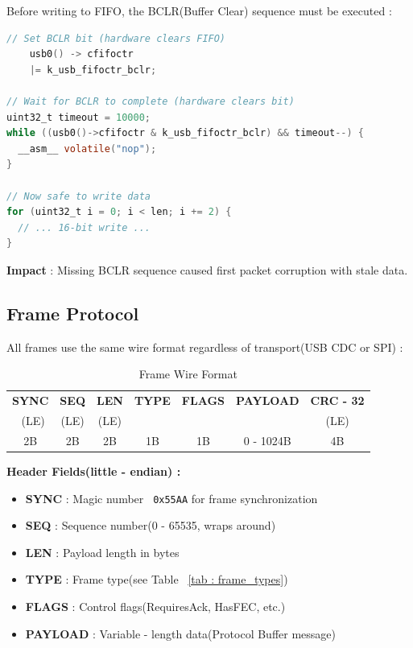                   Before writing to FIFO,
    the BCLR(Buffer Clear) sequence must be executed :

\begin{lstlisting}[language = C, caption = {FIFO Clear Before Write},
                    label = {lst : fifo_clear}]
    // Set BCLR bit (hardware clears FIFO)
    usb0() -> cfifoctr
    |= k_usb_fifoctr_bclr;

// Wait for BCLR to complete (hardware clears bit)
uint32_t timeout = 10000;
while ((usb0()->cfifoctr & k_usb_fifoctr_bclr) && timeout--) {
  __asm__ volatile("nop");
}

// Now safe to write data
for (uint32_t i = 0; i < len; i += 2) {
  // ... 16-bit write ...
}
\end{lstlisting}

\textbf{Impact}
    : Missing BCLR sequence caused first packet corruption with stale data.

\subsection{Frame Protocol}

      All frames use the same wire format regardless of
      transport(USB CDC or SPI)
    :

\begin{table}[h]
\centering
\begin{tabular} {
  ccccccc
}
\toprule
\textbf{SYNC} & \textbf{SEQ} & \textbf{LEN} & \textbf{TYPE} & \textbf{FLAGS} & \textbf{PAYLOAD} & \textbf{CRC - 32} \\
\ (LE) & (LE) & (LE) & &&&(LE) \\
\midrule 2B & 2B & 2B & 1B & 1B & 0 - 1024B & 4B \\
\bottomrule
\end{tabular}
\caption { Frame Wire Format}
\label {
tab:
  frame_format
}
\end{table}

\textbf{Header Fields(little - endian) :}
\begin{itemize}
\item \textbf{SYNC} : Magic number \texttt { 0x55AA} for
  frame synchronization
\item \textbf{SEQ} : Sequence number(0 - 65535, wraps around)
\item \textbf{LEN} : Payload length in bytes
\item \textbf{TYPE} : Frame
                       type(see Table ~\ref{tab : frame_types})
\item \textbf{FLAGS} : Control flags(RequiresAck, HasFEC, etc.)
\item \textbf{PAYLOAD} : Variable
                          -
                          length data(Protocol Buffer message)
\end{itemize}

